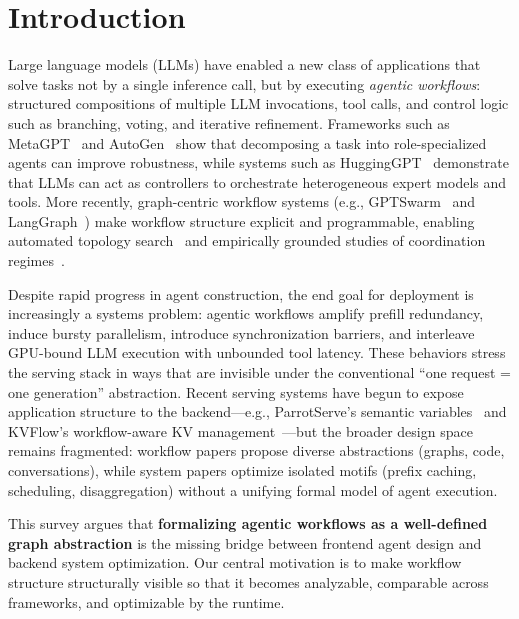 \section{Introduction}
\label{sec:introduction}

Large language models (LLMs) have enabled a new class of applications that solve tasks not by a single inference call, but by executing \emph{agentic workflows}: structured compositions of multiple LLM invocations, tool calls, and control logic such as branching, voting, and iterative refinement. Frameworks such as MetaGPT~\citep{hong2023metagpt} and AutoGen~\citep{wu2023autogen} show that decomposing a task into role-specialized agents can improve robustness, while systems such as HuggingGPT~\citep{shen2023hugginggpt} demonstrate that LLMs can act as controllers to orchestrate heterogeneous expert models and tools. More recently, graph-centric workflow systems (e.g., GPTSwarm~\citep{zhuge2024gptswarm} and LangGraph~\citep{langgraph2024docs}) make workflow structure explicit and programmable, enabling automated topology search~\citep{zhang2024aflow,zhang2025maas} and empirically grounded studies of coordination regimes~\citep{kim2025scalingagents}.

Despite rapid progress in agent construction, the end goal for deployment is increasingly a systems problem: agentic workflows amplify prefill redundancy, induce bursty parallelism, introduce synchronization barriers, and interleave GPU-bound LLM execution with unbounded tool latency. These behaviors stress the serving stack in ways that are invisible under the conventional ``one request = one generation'' abstraction. Recent serving systems have begun to expose application structure to the backend---e.g., ParrotServe's semantic variables~\citep{lin2024parrot} and KVFlow's workflow-aware KV management~\citep{pan2025kvflow}---but the broader design space remains fragmented: workflow papers propose diverse abstractions (graphs, code, conversations), while system papers optimize isolated motifs (prefix caching, scheduling, disaggregation) without a unifying formal model of agent execution.

This survey argues that \textbf{formalizing agentic workflows as a well-defined graph abstraction} is the missing bridge between frontend agent design and backend system optimization. Our central motivation is to make workflow structure structurally visible so that it becomes analyzable, comparable across frameworks, and optimizable by the runtime.

